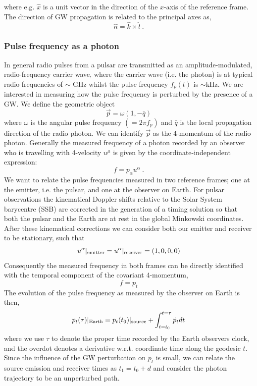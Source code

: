 \documentclass[fleqn,usenatbib,useAMS]{mnras}
\begin{document}
where e.g. $\hat{x}$ is a unit vector in the direction of the $x$-axis of the reference frame. The direction of GW propagation is related to the principal axes as,
\begin{equation}
	\hat{n} = \hat{k} \times \hat{l} \ . 
\end{equation}



\subsubsection{Pulse frequency as a photon}
In general radio pulses from a pulsar are transmitted as an amplitude-modulated, radio-frequency carrier wave, where the carrier wave (i.e. the photon) is at typical radio frequencies of $\sim$ GHz whilst the pulse frequency $f_p(t)$ is $\sim $kHz. We are interested in measuring how the pulse frequency is perturbed by the presence of a GW. We define the geometric object
\begin{equation}
\vec{p} = \omega (1, -\bar{q})
\end{equation} 
where $\omega$ is the angular pulse frequency $(= 2 \pi f_p)$ and $\bar{q}$ is the local propagation direction of the radio photon. We can identify $\vec{p}$ as the 4-momentum of the radio photon. Generally the measured frequency of a photon recorded by an observer who is travelling with 4-velocity $u^{\mu}$ is given by the coordinate-independent expression:
\begin{equation}
	f = p_{\alpha} u^{\alpha} \ . 
	\label{eq:freq_temporal}
\end{equation}
We want to relate the pulse frequencies measured in two reference frames; one at the emitter, i.e. the pulsar, and one at the observer on Earth. For pulsar observations the kinematical Doppler shifts relative to the Solar System barycentre (SSB) are corrected in the generation of a timing solution so that both the pulsar and the Earth are at rest in the global Minkowski coordinates. After these kinematical corrections we can consider both our emitter and receiver to be stationary, such that  
\begin{equation}
	u^{\alpha}|_{\rm emitter} = u^{\alpha}|_{\rm receiver} = (1,0,0,0)
\end{equation}
\noindent Consequently the measured frequency in both frames can be directly identified with the temporal component of the covariant 4-momentum,
\begin{equation}
	f = p_t
\end{equation}
\noindent The evolution of the pulse frequency as measured by the observer on Earth is then,
\begin{equation}
	p_t(\tau)|_{\rm Earth} = p_t(t_0)|_{\rm source} + \int_{t = t_0}^{t=\tau} \dot{p}_t dt
	\label{eq:integral}
\end{equation}
\noindent where we use $\tau$ to denote the proper time recorded by the Earth observers clock, and the overdot denotes a derivative w.r.t. coordinate time along the geodesic $t$. Since the influence of the GW perturbation on $\dot{p}_t$ is small, we can relate the source emission and receiver times as $t_1 = t_0 + d$ and consider the photon trajectory to be an unperturbed path.
\end{document}

